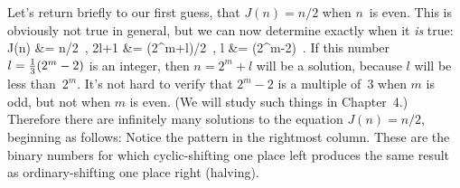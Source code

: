 Let's return briefly to our first guess,
that $J(n)=n/2$ when $n$~is even.
This is obviously not true in general, but
we can now determine exactly when it {\it is\/} true:
\begindisplay {}
J(n)	&= n/2 \,, \cr
2l+1	&= (2^m+l)/2 \,, \cr
l	&= (2^m-2) \,.
\enddisplay
If this number
$l={1\over3}(2^m-2)$ is an integer, then
$n=2^m+l$ will be a solution, because
$l$ will be less than~$2^m$.
It's not hard to verify that $2^m-2$ is a multiple of~$3$
when $m$ is odd, but not when $m$ is even.
(We will study such things in Chapter~4.) Therefore there are
infinitely many solutions to the equation $J(n)=n/2$, beginning as follows:
\begindisplay
\vbox{\offinterlineskip{}}
\enddisplay
Notice the pattern in the rightmost column. These are the binary numbers
for which cyclic-shifting one place left produces the same result
as ordinary-shifting one place right (halving).

